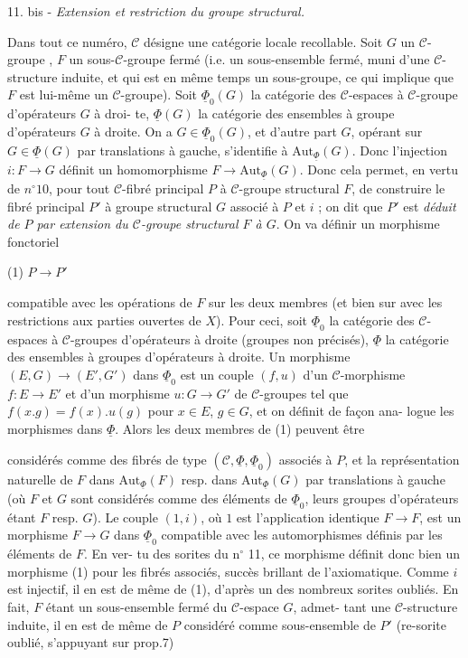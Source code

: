 11. bis - \emph{Extension et restriction du groupe structural.}

Dans tout ce numéro, $\mathcal{C}$ désigne une catégorie locale recollable.
Soit $G$ un $\mathcal{C}$-groupe , $F$ un sous-$\mathcal{C}$-groupe fermé (i.e. un sous-ensemble
fermé, muni d'une $\mathcal{C}$-structure induite, et qui est en même temps un
sous-groupe, ce qui implique que $F$ est lui-même un $\mathcal{C}$-groupe). Soit
$\underline{\Phi}_0(G)$ la catégorie des $\mathcal{C}$-espaces à $\mathcal{C}$-groupe d'opérateurs $G$ à droi-
te, $\underline{\Phi}(G)$ la catégorie des ensembles à groupe d'opérateurs $G$ à droite.
On a $G \in \underline{\Phi}_0(G)$, et d'autre part $G$, opérant sur $G \in \underline{\Phi}(G)$ par translations
à gauche, s'identifie à $\mathrm{Aut}_{\underline{\Phi}}(G)$. Donc l'injection $i:F \to G$ définit un
homomorphisme $F \to \mathrm{Aut}_{\underline{\Phi}}(G)$. Donc cela permet, en vertu de $n^\circ 10$, pour
tout $\mathcal{C}$-fibré principal $P$ à $\mathcal{C}$-groupe structural $F$, de construire le
fibré principal $P'$ à groupe structural $G$ associé à $P$ et $i$ ; on dit que
$P'$ est \emph{déduit de $P$ par extension du $\mathcal{C}$-groupe structural $F$ à $G$}. On va
définir un morphisme fonctoriel

(1) $P \to P'$

compatible avec les opérations de $F$ sur les deux membres (et bien sur
avec les restrictions aux parties ouvertes de $X$). Pour ceci, soit $\underline{\Phi}_0$ la
catégorie des $\mathcal{C}$-espaces à $\mathcal{C}$-groupes d'opérateurs à droite (groupes
non précisés), $\underline{\Phi}$ la catégorie des ensembles à groupes d'opérateurs à
droite. Un morphisme $(E,G) \to (E',G')$ dans $\underline{\Phi}_0$ est un couple $(f,u)$
d'un $\mathcal{C}$-morphisme $f:E \to E'$ et d'un morphisme $u:G \to G'$ de $\mathcal{C}$-groupes
tel que $f(x.g)=f(x).u(g)$ pour $x \in E$, $g \in G$, et on définit de façon ana-
logue les morphismes dans $\underline{\Phi}$. Alors les deux membres de (1) peuvent être

\newpage



considérés comme des fibrés de type $(\mathcal{C}, \underline{\Phi}, \underline{\Phi}_0)$ associés à $P$, et la
représentation naturelle de $F$ dans $\mathrm{Aut}_{\underline{\Phi}}(F)$ resp. dans $\mathrm{Aut}_{\underline{\Phi}}(G)$ par
translations à gauche (où $F$ et $G$ sont considérés comme des éléments de
$\underline{\Phi}_0$, leurs groupes d'opérateurs étant $F$ resp. $G$). Le couple $(1,i)$, où
$1$ est l'application identique $F \to F$, est un morphisme $F \to G$ dans $\underline{\Phi}_0$
compatible avec les automorphismes définis par les éléments de $F$. En ver-
tu des sorites du n$^\circ$ 11, ce morphisme définit donc bien un morphisme (1)
pour les fibrés associés, succès brillant de l'axiomatique. Comme $i$ est
injectif, il en est de même de (1), d'après un des nombreux sorites
oubliés. En fait, $F$ étant un sous-ensemble fermé du $\mathcal{C}$-espace $G$, admet-
tant une $\mathcal{C}$-structure induite, il en est de même de $P$ considéré comme
sous-ensemble de $P'$ (re-sorite oublié, s'appuyant sur prop.7)

